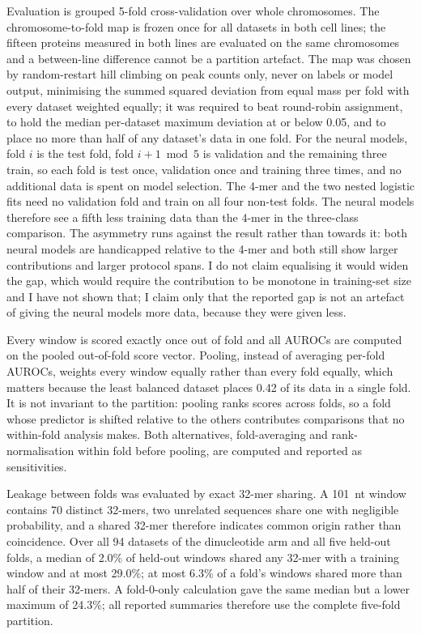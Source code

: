 Evaluation is grouped 5-fold cross-validation over whole chromosomes. The chromosome-to-fold map
is frozen once for all datasets in both cell lines; the fifteen proteins measured in both
lines are evaluated on the same chromosomes and a between-line difference cannot be a partition
artefact. The map was chosen by random-restart hill climbing on peak counts only, never on labels
or model output, minimising the summed squared deviation from equal mass per fold with every
dataset weighted equally; it was required to beat round-robin assignment, to hold the median
per-dataset maximum deviation at or below 0.05, and to place no more than half of any dataset's
data in one fold. For the neural models, fold $i$ is the test fold, fold $i+1 \bmod 5$ is
validation and the remaining three train, so each fold is test once, validation once and
training three times, and no additional data is spent on model selection. The 4-mer and the two
nested logistic fits need no validation fold and train on all four non-test folds. The neural
models therefore see a fifth less training data than the 4-mer in the three-class comparison.
The asymmetry runs against the result rather than towards it: both neural models are handicapped
relative to the 4-mer and both still show larger contributions and larger protocol spans. I do
not claim equalising it would widen the gap, which would require the contribution to be
monotone in training-set size and I have not shown that; I claim only that the reported gap
is not an artefact of giving the neural models more data, because they were given less.

Every window is scored exactly once out of fold and all AUROCs are computed on the pooled
out-of-fold score vector. Pooling, instead of averaging per-fold AUROCs, weights every window
equally rather than every fold equally, which matters because the least balanced dataset places
0.42 of its data in a single fold. It is not invariant to the partition: pooling ranks scores
across folds, so a fold whose predictor is shifted relative to the others contributes
comparisons that no within-fold analysis makes. Both alternatives, fold-averaging and
rank-normalisation within fold before pooling, are computed and reported as sensitivities.

Leakage between folds was evaluated by exact 32-mer sharing. A 101~nt window contains 70 distinct
32-mers, two unrelated sequences share one with negligible probability, and a shared 32-mer
therefore indicates common origin rather than coincidence. Over all 94 datasets of the
dinucleotide arm and all five held-out folds, a median of 2.0\% of held-out windows shared any
32-mer with a training window and at most 29.0\%; at most 6.3\% of a fold's windows shared more
than half of their 32-mers. A fold-0-only calculation gave the same median but a lower maximum
of 24.3\%; all reported summaries therefore use the complete five-fold partition.

